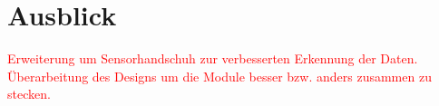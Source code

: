 \chapter{Ausblick}
\label{ch:Ausblick}

\textcolor{red}{Erweiterung um Sensorhandschuh zur verbesserten Erkennung der Daten. Überarbeitung des Designs um die Module besser bzw. anders zusammen zu stecken.}